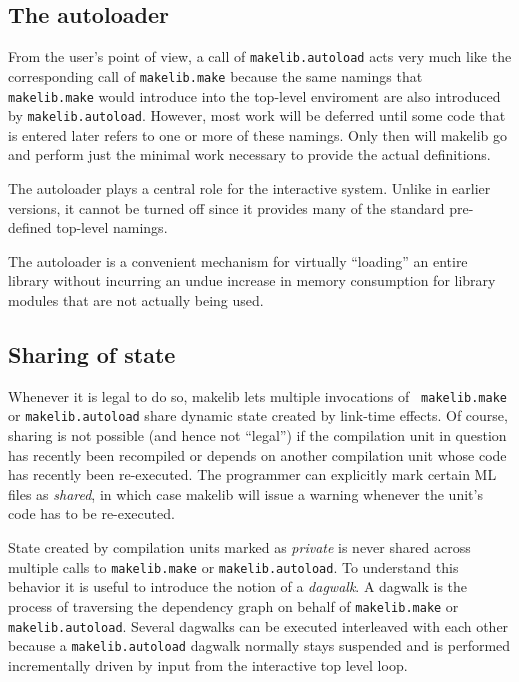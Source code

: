 \subsection{The autoloader}
\label{sec:autoload}

From the user's point of view, a call of {\tt makelib.autoload} acts very
much like the corresponding call of {\tt makelib.make} because the same
namings that {\tt makelib.make} would introduce into the top-level
enviroment are also introduced by {\tt makelib.autoload}.  However, most
work will be deferred until some code that is entered later refers to
one or more of these namings.  Only then will makelib go and perform just
the minimal work necessary to provide the actual definitions.

The autoloader plays a central role for the interactive system.
Unlike in earlier versions, it cannot be turned off since it provides
many of the standard pre-defined top-level namings.

The autoloader is a convenient mechanism for virtually ``loading'' an
entire library without incurring an undue increase in memory
consumption for library modules that are not actually being used.

\subsection{Sharing of state}
\label{sec:sharing}

Whenever it is legal to do so, makelib lets multiple invocations of {\tt
makelib.make} or {\tt makelib.autoload} share dynamic state created by link-time
effects.  Of course, sharing is not possible (and hence not ``legal'')
if the compilation unit in question has recently been recompiled or
depends on another compilation unit whose code has recently been
re-executed.  The programmer can explicitly mark certain ML files as
{\em shared}, in which case makelib will issue a warning whenever the
unit's code has to be re-executed.

State created by compilation units marked as {\em private} is never
shared across multiple calls to {\tt makelib.make} or {\tt makelib.autoload}.
To understand this behavior it is useful to introduce the notion of a
{\em dagwalk}.  A dagwalk is the process of traversing the
dependency graph on behalf of {\tt makelib.make} or {\tt makelib.autoload}.
Several dagwalks can be executed interleaved with each other because
a {\tt makelib.autoload} dagwalk normally stays suspended and is
performed incrementally driven by input from the interactive top level
loop.

